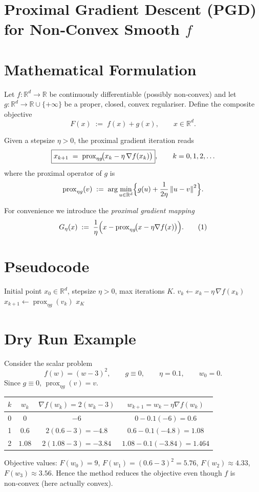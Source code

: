\documentclass{article}
\newcommand{\prox}{\operatorname{prox}}
\newcommand{\grad}{\nabla}
\newcommand{\R}{\mathbb{R}}
\newcommand{\norm}[1]{\left\|#1\right\|}
\begin{document}
\section*{Proximal Gradient Descent (PGD) for Non‑Convex Smooth $f$}

\section*{Mathematical Formulation}
Let $f:\R^{d}\to\R$ be continuously differentiable (possibly non‑convex) and let $g:\R^{d}\to\R\cup\{+\infty\}$ be a proper, closed, convex regulariser.  
Define the composite objective
\[
F(x)\;:=\;f(x)+g(x),\qquad x\in\R^{d}.
\]

Given a stepsize $\eta>0$, the proximal gradient iteration reads
\begin{equation}
\boxed{%
x_{k+1}\;=\;\prox_{\eta g}\!\bigl(x_{k}-\eta\,\grad f(x_{k})\bigr)},
\qquad k=0,1,2,\dots
\label{eq:pgd}
\end{equation}
where the proximal operator of $g$ is
\[
\prox_{\eta g}(v)\;:=\;\arg\min_{u\in\R^{d}}
\Bigl\{ g(u)+\frac{1}{2\eta}\norm{u-v}^{2}\Bigr\}.
\]

For convenience we introduce the \emph{proximal gradient mapping}
\[
G_{\eta}(x)\;:=\;\frac{1}{\eta}\Bigl(x-\prox_{\eta g}\!\bigl(x-\eta\grad f(x)\bigr)\Bigr).
\tag{1}
\]

\section*{Pseudocode}
\begin{algorithm}[H]
\caption{Proximal Gradient Descent}
\begin{algorithmic}[1]
\REQUIRE Initial point $x_{0}\in\R^{d}$, stepsize $\eta>0$, max iterations $K$.
    \STATE $v_{k}\gets x_{k}-\eta\,\grad f(x_{k})$
    \STATE $x_{k+1}\gets \prox_{\eta g}(v_{k})$
\ENDFOR
\ENSURE $x_{K}$
\end{algorithmic}
\end{algorithm}

\section*{Dry Run Example}
Consider the scalar problem
\[
f(w)=(w-3)^{2},\qquad g\equiv0,\qquad \eta=0.1,\qquad w_{0}=0.
\]
Since $g\equiv0$, $\prox_{\eta g}(v)=v$.
\begin{center}
\begin{tabular}{c|c|c|c}
$k$ & $w_{k}$ & $\grad f(w_{k})=2(w_{k}-3)$ & $w_{k+1}=w_{k}-\eta\grad f(w_{k})$\\\hline
0 & $0$ & $-6$ & $0-0.1(-6)=0.6$\\
1 & $0.6$ & $2(0.6-3)=-4.8$ & $0.6-0.1(-4.8)=1.08$\\
2 & $1.08$ & $2(1.08-3)=-3.84$ & $1.08-0.1(-3.84)=1.464$\\
\end{tabular}
\end{center}
Objective values: $F(w_{0})=9$, $F(w_{1})=(0.6-3)^{2}=5.76$, $F(w_{2})\approx4.33$, $F(w_{3})\approx3.56$.
Hence the method reduces the objective even though $f$ is non‑convex (here actually convex).
\end{document}
